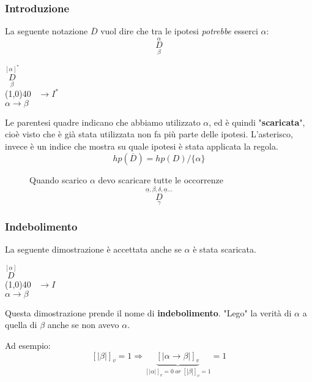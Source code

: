 \documentclass{article}
\theoremstyle{break}
\theoremstyle{break}
\theoremstyle{break}
\theoremstyle{break}
\begin{document}
\subsubsection{Introduzione}
 
La seguente notazione \( \overline{D} \) vuol dire che tra le ipotesi \emph{potrebbe} esserci \( \alpha \):
\[
    \underset{\beta}{\stackrel{\alpha}{D}}
\] 
\begin{center}
    \(
    \underset{\beta}{\stackrel{[\alpha]^*}{D}}
    \)\\ 
    \hspace{1cm}\line(1,0){40}\(\;\;\; \to I^* \)\\
    \(
        \alpha \to \beta
    \) 
\end{center}
Le parentesi quadre indicano che abbiamo utilizzato \( \alpha \), ed è quindi "\textbf{scaricata}",
cioè visto che è già stata utilizzata non fa più parte delle ipotesi. L'asterisco, invece è un indice
che mostra su quale ipotesi è stata applicata la regola.
\[
    hp(\overline{D})=hp(D) / \{\alpha\} 
\] 

\begin{figure}[H]
    \begin{example}
        Quando scarico \( \alpha \) devo scaricare tutte le occorrenze 
        \[
            \stackrel{\underline{\alpha},\beta,\delta,\underline{\alpha} \ldots}{\underset{\gamma}{D}}
        \] 
    \end{example}
\end{figure}

\subsubsection{Indebolimento}
        La seguente dimostrazione è accettata anche se \( \alpha \) è stata scaricata.
        \begin{center}
            \(\stackrel{[\alpha]}{D}\)\\
            \hspace{1cm}\line(1,0){40}\(\;\;\; \to I \)\\
            \( \alpha \to \beta \) 
        \end{center}
        Questa dimostrazione prende il nome di \textbf{indebolimento}. "Lego" la verità di \( \alpha \) 
        a quella di \( \beta \) anche se non avevo \( \alpha \).

        Ad esempio:
        \[
            [|\beta|]_v=1 \Rightarrow \underbrace{[|\alpha \to \beta|]_v}_{[|\alpha|]_v=0\;or\;[|\beta|]_v=1}=1
        \] 
\end{document}
